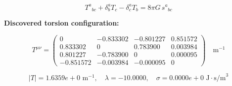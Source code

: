 
\begin{equation}
  T^a{}_{bc} + \delta^a_b T_c - \delta^a_c T_b = 8\pi G \, s^a{}_{bc}
\end{equation}

\textbf{Discovered torsion configuration:}

\begin{equation}
  T^{\mu\nu} = \begin{pmatrix}
    0 & -0.833302 & -0.801227 & 0.851572 \\
    0.833302 & 0 & 0.783900 & 0.003984 \\
    0.801227 & -0.783900 & 0 & 0.000095 \\
    -0.851572 & -0.003984 & -0.000095 & 0
  \end{pmatrix} \quad \text{m}^{-1}
\end{equation}

\begin{equation}
  |T| = 1.6359e+0 \text{ m}^{-1}, \quad
  \lambda = -10.0000, \quad
  \sigma = 0.0000e+0 \text{ J}\cdot\text{s/m}^3
\end{equation}